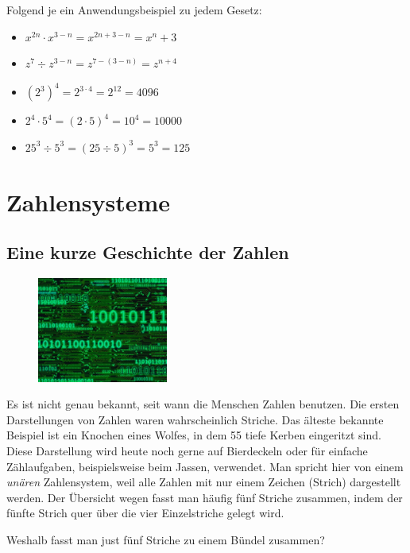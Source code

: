 \documentclass[%
11pt,%
twoside,%
titlepage,%
german,%
]{scrartcl}
\begin{document}
\begin{bsps}
Folgend je ein Anwendungsbeispiel zu jedem Gesetz:
\begin{itemize}
\item $x^{2n}\cdot x^{3-n}=x^{2n+3-n}=x^n+3$
\item $z^7\div z^{3-n}=z^{7-(3-n)}=z^{n+4}$
\item $\left(2^3\right)^4=2^{3\cdot4}=2^{12}=4096$
\item $2^4\cdot5^4=(2\cdot5)^4=10^4=10000$
\item $25^3\div5^3=(25\div5)^3=5^3=125$
\end{itemize}
\end{bsps}

\cleardoublepage

\section{Zahlensysteme}

\subsection{Eine kurze Geschichte der Zahlen}

\begin{figure}
  \begin{center}
    \includegraphics[width=0.382\textwidth]{pictures/binary}
  \end{center}
\end{figure}
Es ist nicht genau bekannt, seit wann die Menschen Zahlen benutzen. Die ersten Darstellungen von Zahlen waren wahrscheinlich Striche. Das \"alteste bekannte Beispiel ist ein Knochen eines Wolfes, in dem 55 tiefe Kerben eingeritzt sind. Diese Darstellung wird heute noch gerne auf Bierdeckeln oder f\"ur einfache Z\"ahlaufgaben, beispielsweise beim Jassen, verwendet. Man spricht hier von einem \emph{un\"aren} Zahlensystem, weil alle Zahlen mit nur einem Zeichen (Strich) dargestellt werden. Der \"Ubersicht wegen fasst man h\"aufig f\"unf Striche zusammen, indem der f\"unfte Strich quer \"uber die vier Einzelstriche gelegt wird.
\begin{ueb}
Weshalb fasst man just f\"unf Striche zu einem B\"undel zusammen?
\end{ueb}
\end{document}

